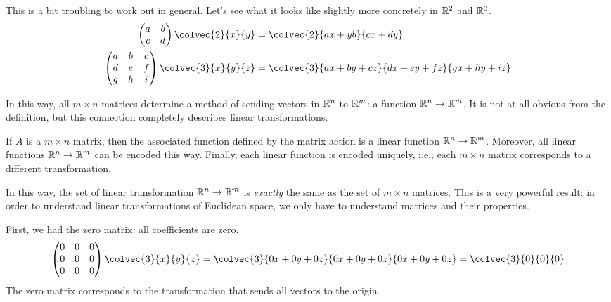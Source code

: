 \documentclass[fleqn,letterpaper]{report}
\begin{document}
This is a bit troubling to work out in general. Let's see
what it looks like slightly more concretely in $\mathbb{R}^2$ and
$\mathbb{R}^3$.
\begin{align*}
\left( 
\begin{matrix}
a & b \\
c & d 
\end{matrix}
\right)
\colvec{2}{x}{y} 
& = 
\colvec{2}{ax + yb}{cx + dy} \\
\left( 
\begin{matrix}
a & b & c \\
d & e & f \\
g & h & i 
\end{matrix}
\right)
\colvec{3}{x}{y}{z} 
& = 
\colvec{3}
{ax + by + cz}{dx + ey + fz}{gx + hy + iz}
\end{align*}

In this way, all $m \times n$ matrices determine a method of
sending vectors in $\mathbb{R}^n$ to $\mathbb{R}^m$: a function $\mathbb{R}^n
\rightarrow \mathbb{R}^m$. It is not at all obvious from the
definition, but this connection completely describes linear
transformations.

\begin{prop}
If $A$ is a $m \times n$ matrix, then the associated function
defined by the matrix action is a linear function $\mathbb{R}^n
\rightarrow \mathbb{R}^m$. Moreover, all linear functions $\mathbb{R}^n
\rightarrow \mathbb{R}^m$ can be encoded this way. Finally, each
linear function is encoded uniquely, i.e., each $m \times n$
matrix corresponds to a different transformation.
\end{prop}

In this way, the set of linear transformation $\mathbb{R}^n
\rightarrow \mathbb{R}^m$ is \emph{exactly} the same as the set of $m
\times n$ matrices. This is a very powerful result: 
in order to understand linear transformations of
Euclidean space, we only have to understand matrices and their
properties. 

\begin{example}
First, we had the zero matrix: all coefficients are zero. 
\begin{displaymath}
\left( 
\begin{matrix}
0 & 0 & 0 \\
0 & 0 & 0 \\
0 & 0 & 0 
\end{matrix}
\right)
\colvec{3}{x}{y}{z} 
= 
\colvec{3}
{0x + 0y + 0z}{0x + 0y + 0z}{0x + 0y + 0z}
= 
\colvec{3}{0}{0}{0} 
\end{displaymath}
The zero matrix corresponds to the transformation that sends
all vectors to the origin. 
\end{example}
\end{document}
